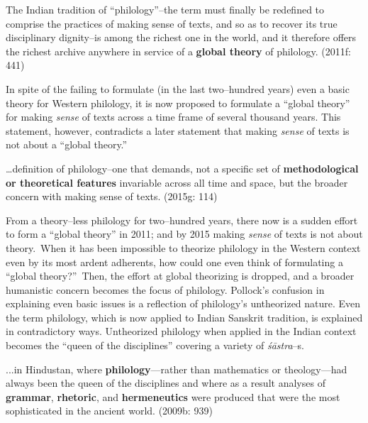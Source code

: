 \begin{myquote}
The Indian tradition of “philology”–the term must finally be redefined to comprise the practices of making sense of texts, and so as to recover its true disciplinary dignity–is among the richest one in the world, and it therefore offers the richest archive anywhere in service of a \textbf{global theory} of philology. (2011f: 441)
\end{myquote}

In spite of the failing to formulate (in the last two–hundred years) even a basic theory for Western philology, it is now proposed to formulate a “global theory” for making \textit{sense} of texts across a time frame of several thousand years. This statement, however, contradicts a later statement that making \textit{sense} of texts is not about a “global theory.”

\begin{myquote}
…definition of philology–one that demands, not a speciﬁc set of \textbf{methodological or theoretical features} invariable across all time and space, but the broader concern with making sense of texts. (2015g: 114)
\end{myquote}


From a theory–less philology for two–hundred years, there now is a sudden effort to form a “global theory” in 2011; and by 2015 making \textit{sense} of texts is not about theory.~When it has been impossible to theorize philology in the Western context even by its most ardent adherents, how could one even think of formulating a “global theory?”~Then, the effort at global theorizing is dropped, and a broader humanistic concern becomes the focus of philology. Pollock’s confusion in explaining even basic issues is a reflection of philology’s untheorized nature. Even the term philology, which is now applied to Indian Sanskrit tradition, is explained in contradictory ways. Untheorized philology when applied in the Indian context becomes the “queen of the disciplines” covering a variety of \textit{śāstra}–s.

\begin{myquote}
...in Hindustan, where \textbf{philology}—rather than mathematics or theology—had always been the queen of the disciplines and where as a result analyses of \textbf{grammar}, \textbf{rhetoric}, and \textbf{hermeneutics} were produced that were the most sophisticated in the ancient world. (2009b: 939)
\end{myquote}


